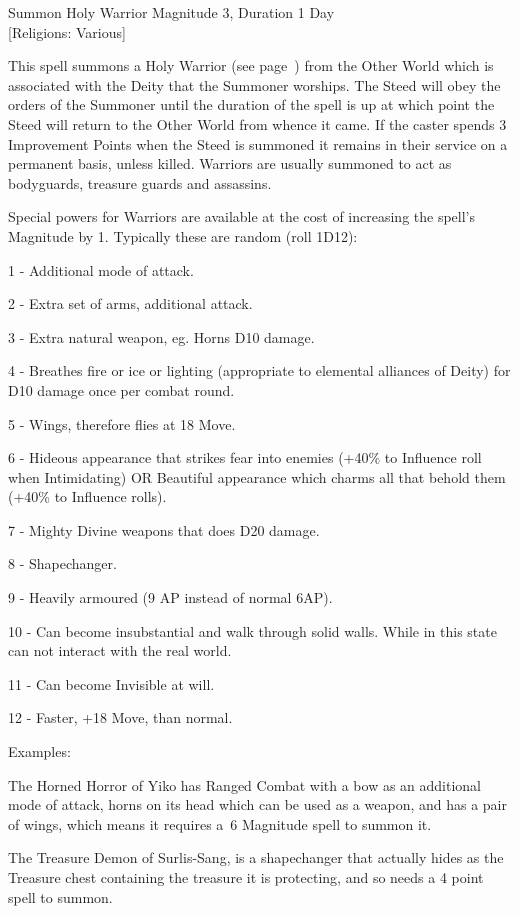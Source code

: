 \begin{samepage}
\begin{rpg-spell}
{Summon Holy Warrior}
{Magnitude 3, Duration 1 Day\\{[Religions: Various]}}

This spell summons a Holy Warrior (see page~\pageref{monster:holy-warrior}) from the Other World which is associated with the Deity that the Summoner worships. The Steed will obey the orders of the Summoner until the duration of the spell is up at which point the Steed will return to the Other World from whence it came. If the caster spends 3 Improvement Points when the Steed is summoned it remains in their service on a permanent basis, unless killed. Warriors are usually summoned to act as bodyguards, treasure guards and assassins.

Special powers for Warriors are available at the cost of increasing the spell’s Magnitude by 1. Typically these are random (roll 1D12):
\begin{rpg-list}
\item 1 - Additional mode of attack.
\item 2 - Extra set of arms, additional attack.
\item 3 - Extra natural weapon, eg. Horns D10 damage.
\item 4 - Breathes fire or ice or lighting (appropriate to elemental alliances of Deity) for D10 damage once per combat round.
\item 5 - Wings, therefore flies at 18 Move.
\item 6 - Hideous appearance that strikes fear into enemies (+40\% to Influence roll when Intimidating) OR Beautiful appearance which charms all that behold them (+40\% to Influence rolls).
\item 7 - Mighty Divine weapons that does D20 damage.
\item 8 - Shapechanger.
\item 9 - Heavily armoured (9 AP instead of normal 6AP).
\item 10 - Can become insubstantial and walk through solid walls. While in this state can not interact with the real world.
\item 11 - Can become Invisible at will.
\item 12 - Faster, +18 Move, than normal.
\end{rpg-list}

Examples:

The Horned Horror of Yiko has Ranged Combat with a bow as an additional mode of attack, horns on its head which can be used as a weapon, and has a pair of wings, which means it requires a 6 Magnitude spell to summon it.

The Treasure Demon of Surlis-Sang, is a shapechanger that actually hides as the Treasure chest containing the treasure it is protecting, and so needs a 4 point spell to summon.
\end{rpg-spell}
\end{samepage}

